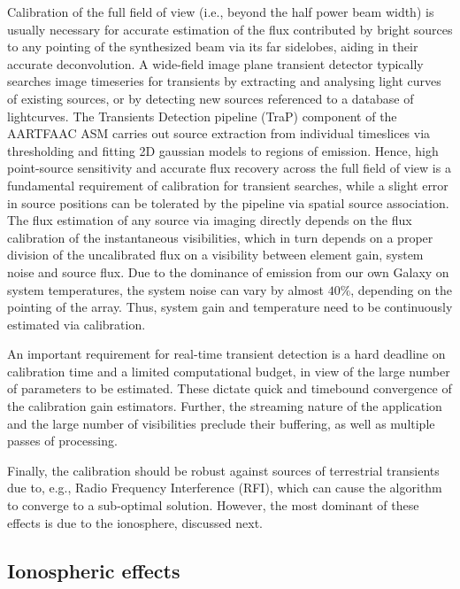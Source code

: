 \documentclass{aa}
\begin{document}
Calibration of the  full field of view (i.e., beyond the  half power beam width)
is usually necessary  for accurate estimation of the  flux contributed by bright
sources to any pointing of the synthesized beam via its far sidelobes, aiding in
their  accurate  deconvolution.  A  wide-field  image  plane transient  detector
typically searches  image timeseries for transients by  extracting and analysing
light curves  of existing sources, or  by detecting new sources  referenced to a
database   of   lightcurves.    The   Transients   Detection   pipeline   (TraP)
\citep{swinbank2013trap}  component  of  the  AARTFAAC ASM  carries  out  source
extraction from  individual timeslices via thresholding and  fitting 2D gaussian
models  to  regions  of  emission.   Hence, high  point-source  sensitivity  and
accurate  flux  recovery  across  the  full  field  of  view  is  a  fundamental
requirement  of calibration  for transient  searches,  while a  slight error  in
source  positions  can   be  tolerated  by  the  pipeline   via  spatial  source
association.  The flux estimation of  any source via imaging directly depends on
the flux calibration of the instantaneous visibilities, which in turn depends on
a proper division of the uncalibrated flux on a visibility between element gain,
system noise  and source flux.   Due to the  dominance of emission from  our own
Galaxy  on system  temperatures, the  system noise  can vary  by  almost $40\%$,
depending on the pointing of the  array.  Thus, system gain and temperature need
to be continuously estimated via calibration.

An important requirement for real-time transient detection is a hard deadline on
calibration time and a limited computational budget, in view of the large number
of parameters to be estimated.  These dictate quick and timebound convergence of
the  calibration  gain  estimators.    Further,  the  streaming  nature  of  the
application and  the large number  of visibilities preclude their  buffering, as
well as multiple passes of processing.

Finally,  the  calibration  should  be  robust against  sources  of  terrestrial
transients due to, e.g., Radio Frequency Interference (RFI), which can cause the
algorithm to converge to a  sub-optimal solution.  However, the most dominant of
these effects is due to the ionosphere, discussed next.

\subsection{\label{sub:All-Sky-cal-iono}Ionospheric effects}
\end{document}
